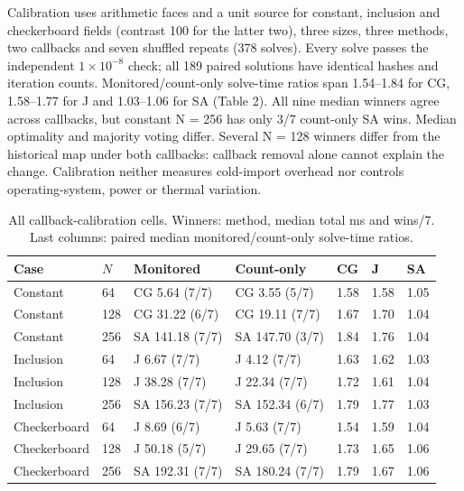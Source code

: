 \documentclass[10pt]{article}
\begin{document}
Calibration uses arithmetic faces and a unit source for constant, inclusion and checkerboard fields (contrast 100 for the latter two), three sizes, three methods, two callbacks and seven shuffled repeats (378 solves). Every solve passes the independent \ensuremath{1\times10^{-8}} check; all 189 paired solutions have identical hashes and iteration counts. Monitored/count-only solve-time ratios span 1.54--1.84 for CG, 1.58--1.77 for J and 1.03--1.06 for SA (Table 2). All nine median winners agree across callbacks, but constant N = 256 has only 3/7 count-only SA wins. Median optimality and majority voting differ. Several N = 128 winners differ from the historical map under both callbacks: callback removal alone cannot explain the change. Calibration neither measures cold-import overhead nor controls operating-system, power or thermal variation.\par
\begin{table}[htbp]
\centering
\caption{All callback-calibration cells. Winners: method, median total ms and wins/7. Last columns: paired median monitored/count-only solve-time ratios.}
\label{tab:protocol}
\small
\begin{tabular}{lllllll}
\toprule
Case & $N$ & Monitored & Count-only & CG & J & SA \\
\midrule
Constant & 64 & CG 5.64 (7/7) & CG 3.55 (5/7) & 1.58 & 1.58 & 1.05 \\
Constant & 128 & CG 31.22 (6/7) & CG 19.11 (7/7) & 1.67 & 1.70 & 1.04 \\
Constant & 256 & SA 141.18 (7/7) & SA 147.70 (3/7) & 1.84 & 1.76 & 1.04 \\
Inclusion & 64 & J 6.67 (7/7) & J 4.12 (7/7) & 1.63 & 1.62 & 1.03 \\
Inclusion & 128 & J 38.28 (7/7) & J 22.34 (7/7) & 1.72 & 1.61 & 1.04 \\
Inclusion & 256 & SA 156.23 (7/7) & SA 152.34 (6/7) & 1.79 & 1.77 & 1.03 \\
Checkerboard & 64 & J 8.69 (6/7) & J 5.63 (7/7) & 1.54 & 1.59 & 1.04 \\
Checkerboard & 128 & J 50.18 (5/7) & J 29.65 (7/7) & 1.73 & 1.65 & 1.06 \\
Checkerboard & 256 & SA 192.31 (7/7) & SA 180.24 (7/7) & 1.79 & 1.67 & 1.06 \\
\bottomrule
\end{tabular}
\end{table}
\end{document}
